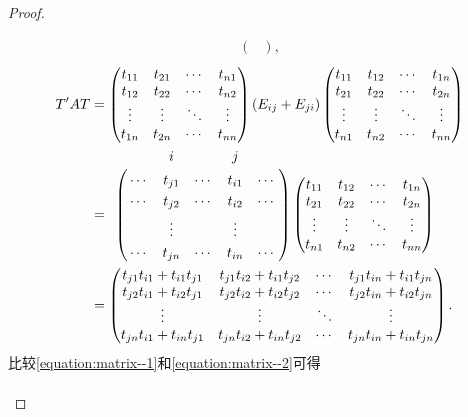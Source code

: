 \documentclass[../../main.tex]{subfiles}
\begin{document}
\begin{proof}
\begin{enumerate}[(1)]
\begin{align}
\begin{pmatrix}
\end{pmatrix},\label{equation:matrix--1}
\end{align}
\begin{align}
T'AT &= \begin{pmatrix}
t_{11} & t_{21} & \cdots & t_{n1} \\
t_{12} & t_{22} & \cdots & t_{n2} \\
\vdots & \vdots & \ddots & \vdots \\
t_{1n} & t_{2n} & \cdots & t_{nn} \\
\end{pmatrix}
(E_{ij}+E_{ji})
\begin{pmatrix}
t_{11} & t_{12} & \cdots & t_{1n} \\
t_{21} & t_{22} & \cdots & t_{2n} \\
\vdots & \vdots & \ddots & \vdots \\
t_{n1} & t_{n2} & \cdots & t_{nn} \\
\end{pmatrix}
\nonumber
\\
&= \bordermatrix{%
&    &    i&       &   j&  \cr
& \cdots & t_{j1} & \cdots & t_{i1} & \cdots \cr
&\cdots & t_{j2} & \cdots & t_{i2} & \cdots \cr
&  & \vdots&  &\vdots &\cr
&\cdots & t_{jn} & \cdots & t_{in} & \cdots \cr
}
\begin{pmatrix}
t_{11} & t_{12} & \cdots & t_{1n} \\
t_{21} & t_{22} & \cdots & t_{2n} \\
\vdots & \vdots & \ddots & \vdots \\
t_{n1} & t_{n2} & \cdots & t_{nn} \\
\end{pmatrix}
\nonumber
\\
&= \begin{pmatrix}
t_{j1}t_{i1} + t_{i1}t_{j1} & t_{j1}t_{i2} + t_{i1}t_{j2} & \cdots & t_{j1}t_{in} + t_{i1}t_{jn} \\
t_{j2}t_{i1} + t_{i2}t_{j1} & t_{j2}t_{i2} + t_{i2}t_{j2} & \cdots & t_{j2}t_{in} + t_{i2}t_{jn} \\
\vdots & \vdots & \ddots & \vdots \\
t_{jn}t_{i1} + t_{in}t_{j1} & t_{jn}t_{i2} + t_{in}t_{j2} & \cdots & t_{jn}t_{in} + t_{in}t_{jn} \\
\end{pmatrix}.\label{equation:matrix--2}
\end{align}
比较\eqref{equation:matrix--1}和\eqref{equation:matrix--2}可得
\begin{align}

\end{align}
\end{enumerate}
\end{proof}
\end{document}
